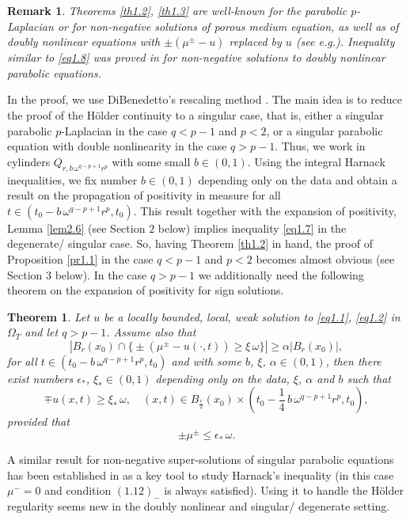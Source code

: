 \documentclass[a4paper,11pt,fullpage]{article}
\numberwithin{equation}{section}
\newtheorem{theorem}{Theorem}[section]
\newtheorem{remark}{Remark}[section]
\begin{document}
\begin{remark}
Theorems \ref{th1.2}, \ref{th1.3} are well-known for the parabolic $p$-Laplacian  or  for non-negative solutions of porous medium equation, as well as of doubly nonlinear equations with $\pm(\mu^{\pm}-u)$ replaced by $u$ (see e.g.\cite{DiB1, DiB3, Bog3}).
Inequality similar to \eqref{eq1.8} was proved in \cite{Cia1} for non-negative solutions to doubly nonlinear parabolic equations.
\end{remark}




In the proof, we use DiBenedetto's rescaling method \cite{DiB1}.
The main idea is to reduce the proof of the H\"{o}lder continuity to a singular case, that is, either a singular parabolic $p$-Laplacian in the case $q < p -1$ and $p < 2$, or a singular parabolic equation with double nonlinearity in the case $q > p -1$. Thus, we  work in cylinders $Q_{r, b\,\omega^{q-p+1} r^p}$ with some small  $b\in (0, 1)$.   Using the integral Harnack inequalities, we fix number $b\in (0, 1)$ depending only on the data and obtain a result on the propagation of positivity in measure for all $t\in (t_0-b\,\omega^{q-p+1} r^p, t_0)$.  This result together with the expansion of positivity, Lemma \ref{lem2.6} (see Section $2$ below) implies inequality \eqref{eq1.7} in the degenerate/ singular case. So, having  Theorem \ref{th1.2} in hand, the proof of Proposition \ref{pr1.1} in the case $q<p-1$ and $p<2$ becomes almost  obvious (see Section $3$ below). In the  case  $q>p-1$  we  additionally need the following theorem on the expansion of positivity for sign  solutions. 

\begin{theorem}\label{th1.4}
Let $u$ be a locally bounded, local, weak solution to \eqref{eq1.1}, \eqref{eq1.2} in $\Omega_T$ and let $q> p-1$. Assume also that
\begin{equation}\label{eq1.10}
|B_r(x_0)\cap\big\{\pm (\mu^{\pm}-u(\cdot, t))\geqslant \xi\,\omega\big\}|\geqslant \alpha|B_r(x_0)|,
\end{equation}
for all $t\in (t_0-b\,\omega^{q-p+1} r^p, t_0)$ and with some $b$, $\xi$, $\alpha \in (0, 1)$, then there exist numbers   $\epsilon_*$, $\xi_*\in (0, 1)$ depending only on the data, $\xi$, $\alpha$ and $b$ such that
\begin{equation}\label{eq1.11}
\mp u(x, t)\geqslant \xi_*\,\omega,\quad  (x, t)\in B_{\frac{r}{2}}(x_0)\times (t_0-\frac{1}{4}\,b\,\omega^{q-p+1} r^p, t_0),
\end{equation}
provided that 
\begin{equation}\label{eq1.12}
\pm\mu^{\pm}\leqslant \epsilon_*\,\omega.
\end{equation}
\end{theorem}
A similar result for non-negative super-solutions of   singular parabolic equations has been established in \cite{DiB3, Bog3, Bog4} as a key tool to study Harnack's inequality (in this case $\mu^-=0$ and condition $(1.12)_-$ is always satisfied). Using it to handle the H\"{o}lder regularity seems new in the doubly nonlinear and singular/ degenerate setting. 
\end{document}
